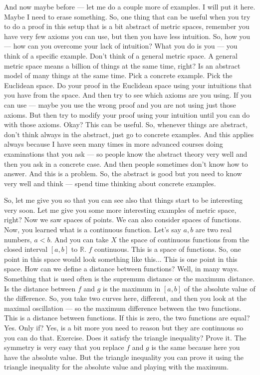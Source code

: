 \begin{spoken-clean}[00:19:15 - 00:21:15]
And now maybe before --- let me do a couple more of examples. I will put it here. Maybe I need to erase something. So, one thing that can be useful when you try to do a proof in this setup that is a bit abstract of metric spaces, remember you have very few axioms you can use, but then you have less intuition. So, how you --- how can you overcome your lack of intuition? What you do is you --- you think of a specific example. Don't think of a general metric space. A general metric space means a billion of things at the same time, right? Is an abstract model of many things at the same time. Pick a concrete example. Pick the Euclidean space. Do your proof in the Euclidean space using your intuitions that you have from the space. And then try to see which axioms are you using. If you can use --- maybe you use the wrong proof and you are not using just those axioms. But then try to modify your proof using your intuition until you can do with those axioms. Okay? This can be useful. So, whenever things are abstract, don't think always in the abstract, just go to concrete examples. And this applies always because I have seen many times in more advanced courses doing examinations that you ask --- so people know the abstract theory very well and then you ask in a concrete case.  And then people sometimes don't know how to answer. And this is a problem. So, the abstract is good but you need to know very well and think --- spend time thinking about concrete examples.

So, let me give you so that you can see also that things start to be interesting very soon. Let me give you some more interesting examples of metric space, right? Now we saw spaces of points. We can also consider spaces of functions. Now, you learned what is a continuous function. Let's say $a, b$ are two real numbers, $a < b$. And you can take $X$ the space of continuous functions from the closed interval $[a, b]$ to $\mathbb{R}$. $f$ continuous. This is a space of functions. So, one point in this space would look something like this...  This is one point in this space. How can we define a distance between functions? Well, in many ways. Something that is used often is the supremum distance or the maximum distance. Is the distance between $f$ and $g$ is the maximum in $[a, b]$ of the absolute value of the difference. So, you take two curves here, different, and then you look at the maximal oscillation --- so the maximum difference between the two functions. This is a distance between functions. If this is zero, the two functions are equal? Yes. Only if? Yes, is a bit more you need to reason but they are continuous so you can do that. Exercise. Does it satisfy the triangle inequality? Prove it. The symmetry is very easy that you replace $f$ and $g$ is the same because here you have the absolute value. But the triangle inequality you can prove it using the triangle inequality for the absolute value and playing with the maximum.


\end{spoken-clean}
